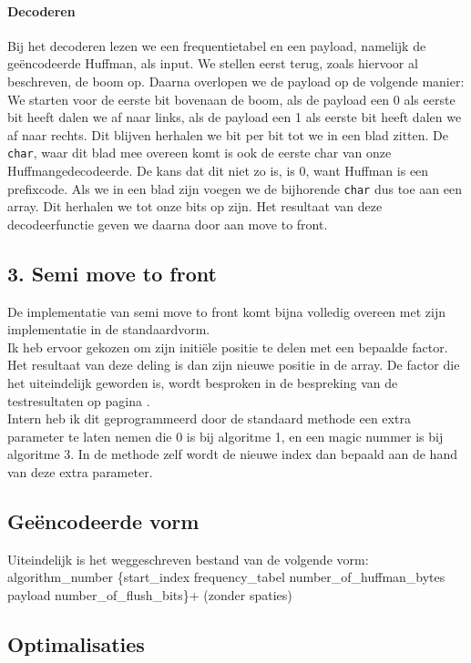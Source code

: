 \documentclass[11pt,a4paper]{article}
\begin{document}
\paragraph*{Decoderen}
Bij het decoderen lezen we een frequentietabel en een payload, namelijk de ge\"encodeerde Huffman, als input. We stellen eerst terug, zoals hiervoor al beschreven, de boom op. Daarna overlopen we de payload op de volgende manier:\\
We starten voor de eerste bit bovenaan de boom, als de payload een 0 als eerste bit heeft dalen we af naar links, als de payload een 1 als eerste bit heeft dalen we af naar rechts. Dit blijven herhalen we bit per bit tot we in een blad zitten. De \texttt{char}, waar dit blad mee overeen komt is ook de eerste char van onze Huffmangedecodeerde. De kans dat dit niet zo is, is 0, want Huffman is een prefixcode. Als we in een blad zijn voegen we de bijhorende \texttt{char} dus toe aan een array. Dit herhalen we tot onze bits op zijn. Het resultaat van deze decodeerfunctie geven we daarna door aan move to front.

\subsection{3. Semi move to front}
De implementatie van semi move to front komt bijna volledig overeen met zijn implementatie in de standaardvorm. \\
Ik heb ervoor gekozen om zijn initi\"ele positie te delen met een bepaalde factor. Het resultaat van deze deling is dan zijn nieuwe positie in de array. De factor die het uiteindelijk geworden is, wordt besproken in de bespreking van de testresultaten op pagina \pageref{smtf}.\\
Intern heb ik dit geprogrammeerd door de standaard methode een extra parameter te laten nemen die 0 is bij algoritme 1, en een magic nummer is bij algoritme 3. In de methode zelf wordt de nieuwe index dan bepaald aan de hand van deze extra parameter.

\subsection{Ge\"encodeerde vorm}
Uiteindelijk is het weggeschreven bestand van de volgende vorm:\\
algorithm\_number \{start\_index frequency\_tabel number\_of\_huffman\_bytes payload number\_of\_flush\_bits\}+ (zonder spaties)

\subsection{Optimalisaties}
\end{document}
